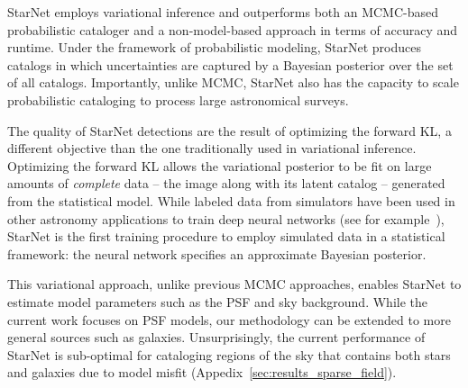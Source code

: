 StarNet employs variational inference and outperforms both an MCMC-based probabilistic cataloger and a non-model-based approach in terms of accuracy and runtime. 
Under the framework of probabilistic modeling, 
StarNet produces catalogs in which uncertainties are captured by a Bayesian posterior over the set of all catalogs.
Importantly, unlike MCMC, StarNet also has the capacity to scale probabilistic cataloging to process large astronomical surveys. 

The quality of StarNet detections are the result of optimizing the forward KL, a different objective than the one traditionally used in variational inference. 
Optimizing the forward KL allows the variational posterior to be fit on large amounts of {\itshape complete} data -- the image along with its latent catalog -- generated from the statistical model. 
While labeled data from simulators have been used in other astronomy applications to train deep neural networks (see for example~\cite{Lanusse_2017_cmudeeplens, huang2019finding}), StarNet is the first training procedure to employ simulated data in a statistical framework: the neural network specifies an approximate Bayesian posterior. 


This variational approach, unlike previous MCMC approaches, enables StarNet to estimate model parameters such as the PSF and sky background.
While the current work focuses on PSF models, our methodology can be extended to more general sources such as galaxies. 
Unsurprisingly, the current performance of StarNet is sub-optimal for cataloging regions of the sky that contains both stars and galaxies due to model misfit (Appedix~\ref{sec:results_sparse_field}).  

